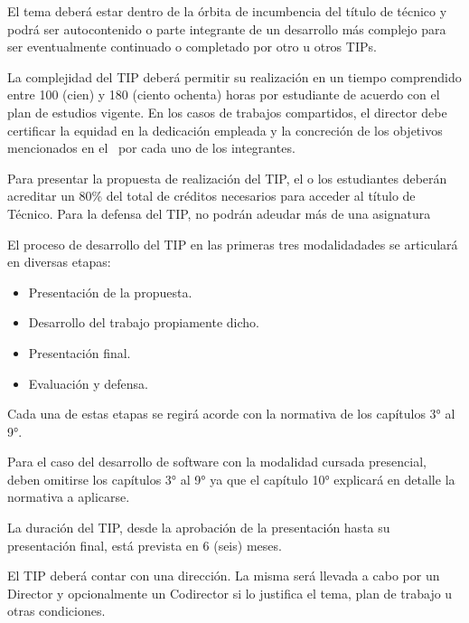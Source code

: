 El tema deberá estar dentro de la órbita de incumbencia del título de técnico y
podrá ser autocontenido o parte integrante de un desarrollo más complejo para ser
eventualmente continuado o completado por otro u otros TIPs.

\articulo La complejidad del TIP deberá permitir su realización en un
tiempo comprendido entre 100 (cien) y 180 (ciento ochenta) horas por estudiante de
acuerdo con el plan de estudios vigente. En los casos de trabajos compartidos, el
director debe certificar la equidad en la dedicación empleada y la concreción de los
objetivos mencionados en el \artObjetivos\ por cada uno de los
integrantes. %

\articulo Para presentar la propuesta de realización del TIP, el o los
estudiantes deberán acreditar un 80\% del total de créditos necesarios para
acceder al título de Técnico. Para la defensa del TIP, no podrán adeudar más de
una asignatura

\articulo El proceso de desarrollo del TIP en las primeras tres modalidadades se articulará en diversas etapas:
\begin{itemize}
 \item Presentación de la propuesta.
 \item Desarrollo del trabajo propiamente dicho.
 \item Presentación final.
 \item Evaluación y defensa.
\end{itemize}

Cada una de estas etapas se regirá acorde con la normativa de los capítulos 3° al 9°.

Para el caso del desarrollo de software con la modalidad cursada presencial, deben omitirse los 
capítulos 3° al 9° ya que el capítulo 10° explicará en detalle la normativa a aplicarse.

\articulo La duración del TIP, desde la aprobación de la presentación hasta
su presentación final, está prevista en 6 (seis) meses. 



\articulo El TIP deberá contar con una dirección. La misma será llevada a
cabo por un Director y opcionalmente un Codirector si lo justifica el tema, plan de
trabajo u otras condiciones.

